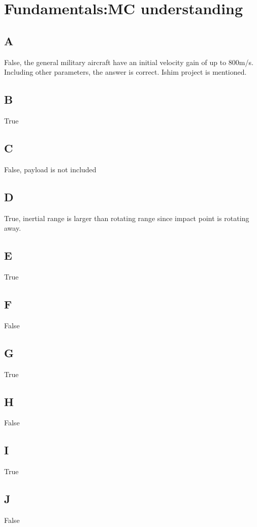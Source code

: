 \section{ Fundamentals:MC understanding }\label{sec:q1}    
\subsection*{A}
False, the general military aircraft have an initial velocity gain of up to 800m/s. Including other parameters, the answer is correct. Ishim project is mentioned.
\subsection*{B}
True
\subsection*{C}
False, payload is not included
\subsection*{D}
True, inertial range is larger than rotating range since impact point is rotating away.
\subsection*{E}
True
\subsection*{F}
False
\subsection*{G}
True
\subsection*{H}
False
\subsection*{I}
True
\subsection*{J}
False